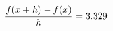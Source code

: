 \documentclass[preview]{standalone}
\begin{document}
\begin{align*}
\special{dvisvgm:raw <g id='unique000'>}\frac{f(x+h)-f(x)}{h} = 3.329\special{dvisvgm:raw </g>}
\end{align*}
\end{document}
